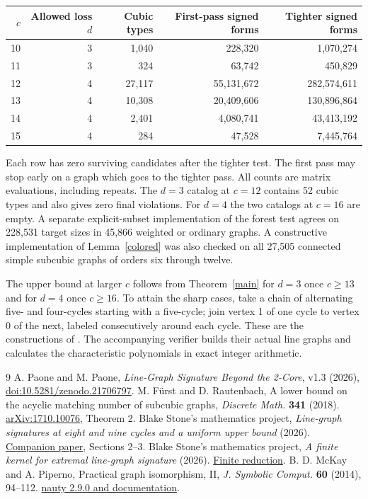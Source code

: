 \documentclass[11pt]{article}
\begin{document}
\begin{center}\begin{tabular}{rrrrr}\toprule
$c$ & Allowed loss $d$ & Cubic types & First-pass signed forms & Tighter signed forms\\\midrule
10&3&1,040&228,320&1,070,274\\
11&3&324&63,742&450,829\\
12&4&27,117&55,131,672&282,574,611\\
13&4&10,308&20,409,606&130,896,864\\
14&4&2,401&4,080,741&43,413,192\\
15&4&284&47,528&7,445,764\\
\bottomrule\end{tabular}\end{center}
Each row has zero surviving candidates after the tighter test. The first pass may stop early on a graph which goes to the tighter pass. All counts are matrix evaluations, including repeats. The $d=3$ catalog at $c=12$ contains 52 cubic types and also gives zero final violations. For $d=4$ the two catalogs at $c=16$ are empty. A separate explicit-subset implementation of the forest test agrees on 228,531 target sizes in 45,866 weighted or ordinary graphs. A constructive implementation of Lemma~\ref{colored} was also checked on all 27,505 connected simple subcubic graphs of orders six through twelve.

The upper bound at larger $c$ follows from Theorem~\ref{main} for $d=3$ once $c\ge13$ and for $d=4$ once $c\ge16$. To attain the sharp cases, take a chain of alternating five- and four-cycles starting with a five-cycle; join vertex 1 of one cycle to vertex 0 of the next, labeled consecutively around each cycle. These are the constructions of \cite{PP}. The accompanying verifier builds their actual line graphs and calculates the characteristic polynomials in exact integer arithmetic.

\begin{thebibliography}{9}
 A. Paone and M. Paone, \emph{Line-Graph Signature Beyond the 2-Core}, v1.3 (2026), \href{https://doi.org/10.5281/zenodo.21706797}{doi:10.5281/zenodo.21706797}.
 M. F\"urst and D. Rautenbach, A lower bound on the acyclic matching number of subcubic graphs, \emph{Discrete Math.} \textbf{341} (2018). \href{https://arxiv.org/abs/1710.10076}{arXiv:1710.10076}, Theorem 2.
 Blake Stone's mathematics project, \emph{Line-graph signatures at eight and nine cycles and a uniform upper bound} (2026). \href{https://github.com/blakestone-x/math/blob/5a9d2730dd28ae3031c488960ae2f6cd08a36803/Line-graph-signature/eight-nine.pdf}{Companion paper}, Sections 2--3.
 Blake Stone's mathematics project, \emph{A finite kernel for extremal line-graph signature} (2026). \href{https://github.com/blakestone-x/math/blob/5a9d2730dd28ae3031c488960ae2f6cd08a36803/Line-graph-signature/addendum.pdf}{Finite reduction}.
 B. D. McKay and A. Piperno, Practical graph isomorphism, II, \emph{J. Symbolic Comput.} \textbf{60} (2014), 94--112. \href{https://pallini.di.uniroma1.it/}{nauty 2.9.0 and documentation}.
\end{thebibliography}
\end{document}
